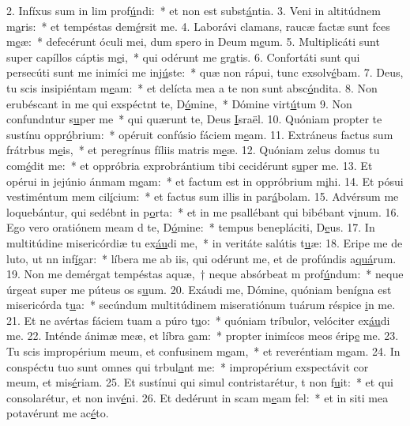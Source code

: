 2. Infíxus sum in lim prof\uline{ú}ndi:~* et non est subst\uline{á}ntia.
3. Veni in altitúdnem m\uline{a}ris:~* et tempéstas dem\uline{é}rsit me.
4. Laborávi clamans, raucæ factæ sunt fces m\uline{e}æ:~* defecérunt óculi mei, dum spero in Deum m\uline{e}um.
5. Multiplicáti sunt super capíllos cáptis m\uline{e}i,~* qui odérunt me gr\uline{a}tis.
6. Confortáti sunt qui persecúti sunt me inimíci me inj\uline{ú}ste:~* quæ non rápui, tunc exsolv\uline{é}bam.
7. Deus, tu scis insipiéntam m\uline{e}am:~* et delícta mea a te non sunt absc\uline{ó}ndita.
8. Non erubéscant in me qui exspéctnt te, D\uline{ó}mine,~* Dómine virt\uline{ú}tum
9. Non confundntur s\uline{u}per me~* qui quærunt te, Deus \uline{I}sraël.
10. Quóniam propter te sustínu oppr\uline{ó}brium:~* opéruit confúsio fáciem m\uline{e}am.
11. Extráneus factus sum frátrbus m\uline{e}is,~* et peregrínus fíliis matris m\uline{e}æ.
12. Quóniam zelus domus tu com\uline{é}dit me:~* et oppróbria exprobrántium tibi cecidérunt s\uline{u}per me.
13. Et opérui in jejúnio ánmam m\uline{e}am:~* et factum est in oppróbrium m\uline{i}hi.
14. Et pósui vestiméntum mem cil\uline{í}cium:~* et factus sum illis in par\uline{á}bolam.
15. Advérsum me loquebántur, qui sedébnt in p\uline{o}rta:~* et in me psallébant qui bibébant v\uline{i}num.
16. Ego vero oratiónem meam d te, D\uline{ó}mine:~* tempus benepláciti, D\uline{e}us.
17. In multitúdine misericórdiæ tu ex\uline{áu}di me,~* in veritáte salútis t\uline{u}æ:
18. Eripe me de luto, ut nn inf\uline{í}gar:~* líbera me ab iis, qui odérunt me, et de profúndis a\uline{quá}rum.
19. Non me demérgat tempéstas aquæ,~† neque absórbeat m prof\uline{ú}ndum:~* neque úrgeat super me púteus os s\uline{u}um.
20. Exáudi me, Dómine, quóniam benígna est misericórda t\uline{u}a:~* secúndum multitúdinem miseratiónum tuárum réspice \uline{i}n me.
21. Et ne avértas fáciem tuam a púro t\uline{u}o:~* quóniam tríbulor, velóciter ex\uline{áu}di me.
22. Inténde ánimæ meæ, et líbra \uline{e}am:~* propter inimícos meos érip\uline{e} me.
23. Tu scis impropérium meum, et confusinem m\uline{e}am,~* et reveréntiam m\uline{e}am.
24. In conspéctu tuo sunt omnes qui trbul\uline{a}nt me:~* impropérium exspectávit cor meum, et mis\uline{é}riam.
25. Et sustínui qui simul contristarétur, t non f\uline{u}it:~* et qui consolarétur, et non inv\uline{é}ni.
26. Et dedérunt in scam m\uline{e}am fel:~* et in siti mea potavérunt me ac\uline{é}to.

